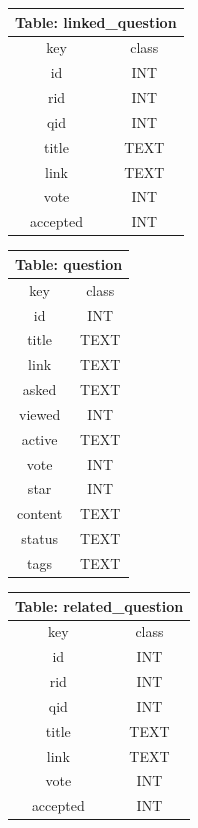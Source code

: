 \documentclass[10pt,journal,compsoc]{IEEEtran}
\begin{document}
\begin{table}[H]
\centering
\begin{tabular}{cc}
\toprule
\multicolumn{2}{c}{\textbf{Table: linked\_question}} \\
\midrule
key                   & class             \\
\midrule
id                    & INT               \\
rid                   & INT               \\
qid                  & INT               \\
title              & TEXT               \\
link               & TEXT   \\ 
vote     & INT \\
accepted  & INT\\
\bottomrule
\end{tabular}
\end{table}

\begin{table}[H]
\centering
\begin{tabular}{cc}
\toprule
\multicolumn{2}{c}{\textbf{Table: question}} \\
\midrule
key                   & class             \\
\midrule
id                    & INT               \\
title              & TEXT               \\
link               & TEXT   \\ 
asked & TEXT\\
viewed & INT\\
active & TEXT\\
vote     & INT \\
star & INT \\
content & TEXT \\
status & TEXT\\
tags & TEXT\\
\bottomrule
\end{tabular}
\end{table}


\begin{table}[H]
\centering
\begin{tabular}{cc}
\toprule
\multicolumn{2}{c}{\textbf{Table: related\_question}} \\
\midrule
key                   & class             \\
\midrule
id                    & INT               \\
rid                   & INT               \\
qid                  & INT               \\
title              & TEXT               \\
link               & TEXT   \\ 
vote     & INT \\
accepted  & INT\\
\bottomrule
\end{tabular}
\end{table}
\end{document}
